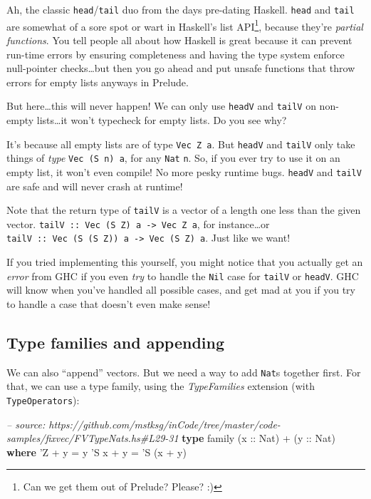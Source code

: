 \documentclass[]{article}
\newenvironment{Shaded}{}{}
\newcommand{\KeywordTok}[1]{\textcolor[rgb]{0.00,0.44,0.13}{\textbf{#1}}}
\newcommand{\DataTypeTok}[1]{\textcolor[rgb]{0.56,0.13,0.00}{#1}}
\newcommand{\CharTok}[1]{\textcolor[rgb]{0.25,0.44,0.63}{#1}}
\newcommand{\CommentTok}[1]{\textcolor[rgb]{0.38,0.63,0.69}{\textit{#1}}}
\newcommand{\OtherTok}[1]{\textcolor[rgb]{0.00,0.44,0.13}{#1}}
\newcommand{\FunctionTok}[1]{\textcolor[rgb]{0.02,0.16,0.49}{#1}}
\newcommand{\NormalTok}[1]{#1}
\begin{document}
Ah, the classic \texttt{head}/\texttt{tail} duo from the days pre-dating
Haskell. \texttt{head} and \texttt{tail} are somewhat of a sore spot or wart in
Haskell's list API\footnote{Can we get them out of Prelude? Please? :)}, because
they're \emph{partial functions}. You tell people all about how Haskell is great
because it can prevent run-time errors by ensuring completeness and having the
type system enforce null-pointer checks\ldots{}but then you go ahead and put
unsafe functions that throw errors for empty lists anyways in Prelude.

But here\ldots{}this will never happen! We can only use \texttt{headV} and
\texttt{tailV} on non-empty lists\ldots{}it won't typecheck for empty lists. Do
you see why?

It's because all empty lists are of type \texttt{Vec\ Z\ a}. But \texttt{headV}
and \texttt{tailV} only take things of \emph{type} \texttt{Vec\ (S\ n)\ a}, for
any \texttt{Nat} \texttt{n}. So, if you ever try to use it on an empty list, it
won't even compile! No more pesky runtime bugs. \texttt{headV} and
\texttt{tailV} are safe and will never crash at runtime!

Note that the return type of \texttt{tailV} is a vector of a length one less
than the given vector.
\texttt{tailV\ ::\ Vec\ (S\ Z)\ a\ -\textgreater{}\ Vec\ Z\ a}, for
instance\ldots{}or
\texttt{tailV\ ::\ Vec\ (S\ (S\ Z))\ a\ -\textgreater{}\ Vec\ (S\ Z)\ a}. Just
like we want!

If you tried implementing this yourself, you might notice that you actually get
an \emph{error} from GHC if you even \emph{try} to handle the \texttt{Nil} case
for \texttt{tailV} or \texttt{headV}. GHC will know when you've handled all
possible cases, and get mad at you if you try to handle a case that doesn't even
make sense!

\subsection{Type families and appending}\label{type-families-and-appending}

We can also ``append'' vectors. But we need a way to add \texttt{Nat}s together
first. For that, we can use a type family, using the \emph{TypeFamilies}
extension (with \texttt{TypeOperators}):

\begin{Shaded}
\begin{Highlighting}[]
\CommentTok{-- source: https://github.com/mstksg/inCode/tree/master/code-samples/fixvec/FVTypeNats.hs#L29-31}
\KeywordTok{type}\NormalTok{ family (}\OtherTok{x ::} \DataTypeTok{Nat}\NormalTok{) }\FunctionTok{+}\NormalTok{ (}\OtherTok{y ::} \DataTypeTok{Nat}\NormalTok{) }\KeywordTok{where}
    \CharTok{'Z   + y = y}
    \CharTok{'S x + y = '}\DataTypeTok{S}\NormalTok{ (x }\FunctionTok{+}\NormalTok{ y)}
\end{Highlighting}
\end{Shaded}
\end{document}
